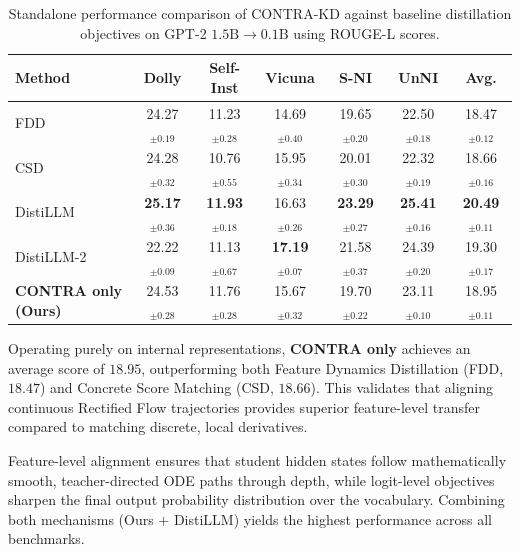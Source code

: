 \documentclass{article} %
\theoremstyle{definition}
\theoremstyle{remark}
\begin{document}
\begin{table}[htbp]
\centering
\small
\setlength{\tabcolsep}{4.5pt}
\caption{Standalone performance comparison of CONTRA-KD against baseline distillation objectives on GPT-2 $1.5\text{B} \to 0.1\text{B}$ using ROUGE-L scores.}
\label{tab:contra_standalone}
\begin{tabular}{lcccccc}
\toprule
\textbf{Method} & \textbf{Dolly} & \textbf{Self-Inst} & \textbf{Vicuna} & \textbf{S-NI} & \textbf{UnNI} & \textbf{Avg.} \\
\midrule
FDD                   & 24.27$_{\pm 0.19}$ & 11.23$_{\pm 0.28}$ & 14.69$_{\pm 0.40}$ & 19.65$_{\pm 0.20}$ & 22.50$_{\pm 0.18}$ & 18.47$_{\pm 0.12}$ \\
CSD                   & 24.28$_{\pm 0.32}$ & 10.76$_{\pm 0.55}$ & 15.95$_{\pm 0.34}$ & 20.01$_{\pm 0.30}$ & 22.32$_{\pm 0.19}$ & 18.66$_{\pm 0.16}$ \\
DistiLLM              & \textbf{25.17}$_{\pm 0.36}$ & \textbf{11.93}$_{\pm 0.18}$ & 16.63$_{\pm 0.26}$ & \textbf{23.29}$_{\pm 0.27}$ & \textbf{25.41}$_{\pm 0.16}$ & \textbf{20.49}$_{\pm 0.11}$ \\
DistiLLM-2            & 22.22$_{\pm 0.09}$ & 11.13$_{\pm 0.67}$ & \textbf{17.19}$_{\pm 0.07}$ & 21.58$_{\pm 0.37}$ & 24.39$_{\pm 0.20}$ & 19.30$_{\pm 0.17}$ \\
\midrule
\textbf{CONTRA only (Ours)} & 24.53$_{\pm 0.28}$ & 11.76$_{\pm 0.28}$ & 15.67$_{\pm 0.32}$ & 19.70$_{\pm 0.22}$ & 23.11$_{\pm 0.10}$ & 18.95$_{\pm 0.11}$ \\
\bottomrule
\end{tabular}
\end{table}

Operating purely on internal representations, \textbf{CONTRA only} achieves an average score of $18.95$, outperforming both Feature Dynamics Distillation (FDD, $18.47$) and Concrete Score Matching (CSD, $18.66$). This validates that aligning continuous Rectified Flow trajectories provides superior feature-level transfer compared to matching discrete, local derivatives.

Feature-level alignment ensures that student hidden states follow mathematically smooth, teacher-directed ODE paths through depth, while logit-level objectives sharpen the final output probability distribution over the vocabulary. Combining both mechanisms (Ours + DistiLLM) yields the highest performance across all benchmarks.
\end{document}
